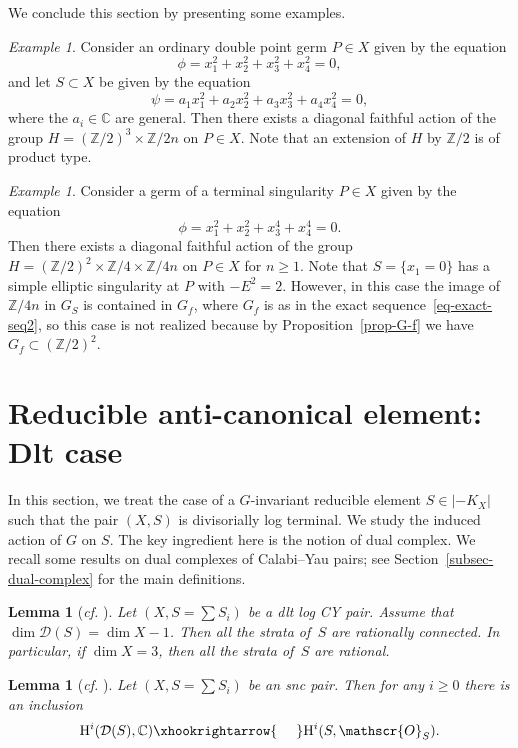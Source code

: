\documentclass[11pt]{amsart}
\numberwithin{equation}{section}
\newtheorem{lem}[thm]{Lemma}
\theoremstyle{definition}
\theoremstyle{remark}
\newtheorem{example}[thm]{Example}
\newcommand{\OOO}{\mathscr{O}}
\begin{document}
We conclude this section by presenting some examples. 

\begin{example}
Consider an ordinary double point germ $P\in X$ given by the equation
\[
\phi = x_1^2+x_2^2+x_3^2+x_4^2 = 0,
\]
and let $S\subset X$ be given by the equation
\[
\psi = a_1x_1^2+a_2x_2^2+a_3x_3^2+a_4x_4^2 = 0,
\]
where the $a_i\in \mathbb{C}$ are general. Then there exists a diagonal faithful action of the group $H=(\mathbb{Z}/2)^3\times\mathbb{Z}/2n$ on $P\in X$. Note that an extension of $H$ by $\mathbb{Z}/2$ is of product type. 
\end{example}

\begin{example}
Consider a germ of a terminal singularity $P\in X$ given by the equation
\[
\phi = x_1^2+x_2^2+x_3^4+x_4^4 = 0.
\]
Then there exists a diagonal faithful action of the group $H=(\mathbb{Z}/2)^2\times\mathbb{Z}/4\times \mathbb{Z}/4n$ on $P\in X$ for $n\geq 1$. Note that  $S=\{x_1=0\}$ has a simple elliptic singularity at $P$ with $-E^2=2$. However, in this case the image of $\mathbb{Z}/4n$ in $G_S$ is contained in $G_f$, where $G_f$ is as in the exact sequence~\eqref{eq-exact-seq2}, so this case is not realized because by Proposition~\ref{prop-G-f} we have $G_f\subset (\mathbb{Z}/2)^2$.
\end{example}

\section{Reducible anti-canonical element: Dlt case}
\label{sec-dual-complex}
In this section, we treat the case of a $G$-invariant reducible element $S\in |-K_X|$ such that the pair $(X, S)$ is divisorially log terminal. We study the induced action of $G$ on $S$. The key ingredient here is the notion of dual complex. 
We recall some results on dual complexes of Calabi--Yau pairs; see Section~\ref{subsec-dual-complex} for the main definitions. 

\begin{lem}[\textit{cf.} {\cite[Claim~32.1(1)]{KX16}}]
\label{lem-strata-are-rational}
Let $(X, S=\sum S_i)$ be a dlt log CY pair.
Assume that $\dim \mathcal{D}(S)=\dim X-1$. Then all the strata of\, $S$ are rationally connected. In particular, if $\dim X=3$, then all the strata of\, $S$ are rational. 
\end{lem}

\begin{lem}[\textit{cf.} {\cite[Lemma 25]{KX16}}]
\label{lem-dual-cohomology}
Let $(X, S = \sum S_i)$ be an snc pair. Then for any $i\geq0$
there is an inclusion
\[
\mathrm{H}^i (\mathcal{D}(S),\mathbb{C}) \xhookrightarrow{\hphantom{0pt}} \mathrm{H}^i (S, \OOO_S).
\]
\end{lem}
\end{document}
